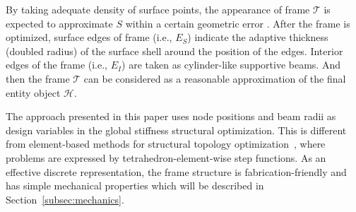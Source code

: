 


By taking adequate density of surface points, the appearance of frame $\mathcal{T}$ is expected to approximate $S$ within a certain geometric error \cite{yan2009isotropic}. After the frame is optimized, surface edges of frame (i.e., $E_S$) indicate the adaptive thickness (doubled radius) of the surface shell around the position of the edges.
Interior edges of the frame (i.e., $E_I$) are taken as cylinder-like supportive beams.
And then the frame $\mathcal{T}$ can be considered as a reasonable approximation of the final entity object $\mathcal{H}$.







The approach presented in this paper uses node positions and beam radii as design variables in the global stiffness structural optimization.
This is different from element-based methods for structural topology optimization~\cite{rozvany:2009}, where problems are expressed by tetrahedron-element-wise step functions.
%
As an effective discrete representation, the frame structure is fabrication-friendly and has simple mechanical properties which will be described in Section~\ref{subsec:mechanics}.



